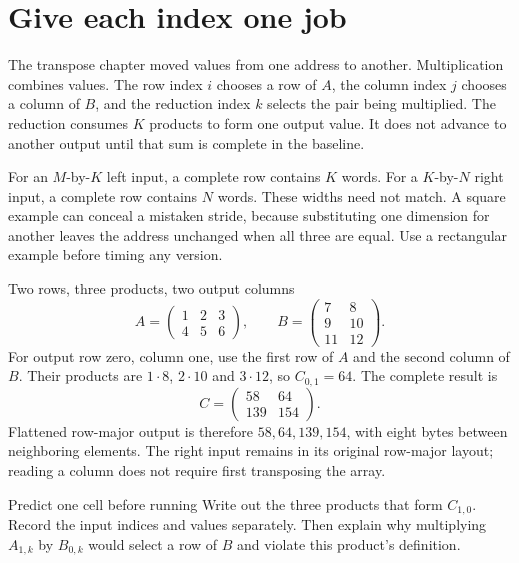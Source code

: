 \section{Give each index one job}
The transpose chapter moved values from one address to another. Multiplication
combines values. The row index \(i\) chooses a row of \(A\), the column index
\(j\) chooses a column of \(B\), and the reduction index \(k\) selects the pair
being multiplied. The reduction consumes \(K\) products to form one output value.
It does not advance to another output until that sum is complete in the baseline.

For an \(M\)-by-\(K\) left input, a complete row contains \(K\) words. For a
\(K\)-by-\(N\) right input, a complete row contains \(N\) words. These widths
need not match. A square example can conceal a mistaken stride, because substituting
one dimension for another leaves the address unchanged when all three are equal.
Use a rectangular example before timing any version.

\begin{MARSWorkedExample}{Two rows, three products, two output columns}
  \[
    A=\begin{pmatrix}1&2&3\\4&5&6\end{pmatrix},\qquad
    B=\begin{pmatrix}7&8\\9&10\\11&12\end{pmatrix}.
  \]
  For output row zero, column one, use the first row of \(A\) and the second
  column of \(B\). Their products are \(1\cdot8\), \(2\cdot10\) and
  \(3\cdot12\), so \(C_{0,1}=64\). The complete result is
  \[
    C=\begin{pmatrix}58&64\\139&154\end{pmatrix}.
  \]
  Flattened row-major output is therefore \(58,64,139,154\), with eight bytes
  between neighboring elements. The right input remains in its original row-major
  layout; reading a column does not require first transposing the array.
\end{MARSWorkedExample}

\begin{MARSExercise}{Predict one cell before running}
  Write out the three products that form \(C_{1,0}\). Record the input indices and
  values separately. Then explain why multiplying \(A_{1,k}\) by \(B_{0,k}\)
  would select a row of \(B\) and violate this product's definition.
\end{MARSExercise}

